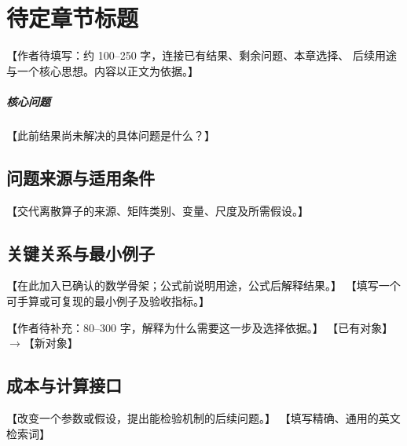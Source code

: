 \chapter{待定章节标题}\label{template:v0}
\begin{chaptersummary}
【作者待填写：约 100--250 字，连接已有结果、剩余问题、本章选择、
后续用途与一个核心思想。内容以正文为依据。】
\end{chaptersummary}
\paragraph{核心问题}【此前结果尚未解决的具体问题是什么？】

\section{问题来源与适用条件}
【交代离散算子的来源、矩阵类别、变量、尺度及所需假设。】

\section{关键关系与最小例子}
【在此加入已确认的数学骨架；公式前说明用途，公式后解释结果。】
【填写一个可手算或可复现的最小例子及验收指标。】

{【作者待补充：80--300 字，解释为什么需要这一步及选择依据。】}
{【已有对象】$\longrightarrow$【新对象】}

\section{成本与计算接口}
{【改变一个参数或假设，提出能检验机制的后续问题。】}
{【填写精确、通用的英文检索词】}
